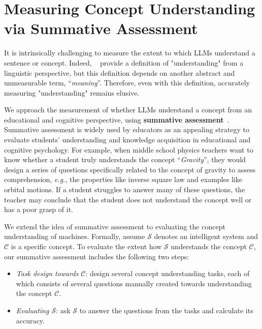 \section{Measuring Concept Understanding via Summative Assessment}
\label{sec:towards}







It is intrinsically challenging to measure the extent to which LLMs {understand} a sentence or concept. Indeed, ~\citet{bender2020climbing} provide a definition of "understanding" from a linguistic perspective, but this definition depends on another abstract and unmeasurable term, ``\emph{meaning}''. 
Therefore, even with this definition, accurately measuring "understanding" remains elusive.

We approach the measurement of whether LLMs understand a concept from an educational and cognitive perspective, using \textbf{summative assessment}~\cite{black1998assessment,black1998inside,harlen1997assessment}.
Summative assessment is widely used by educators as an appealing strategy to evaluate students' understanding and knowledge acquisition in educational and cognitive psychology.
For example, when middle school physics teachers want to know whether a student truly understands the concept ``\emph{Gravity}'', they would design a series of questions specifically related to the concept of gravity to assess comprehension, \emph{e.g.}, the properties like inverse square law and examples like orbital motions. If a student struggles to answer many of these questions, the teacher may conclude that the student does not understand the concept well or has a poor grasp of it.

We extend the idea of summative assessment to evaluating the concept understanding of machines. Formally, assume $\mathcal{S}$ denotes an intelligent system and $\mathcal{C}$ is a specific concept.
To evaluate the extent how $\mathcal{S}$ understands the concept $\mathcal{C}$, our summative assessment includes the following two steps:
\begin{itemize}[noitemsep,nolistsep,leftmargin=*]
    \item \emph{Task design towards $\mathcal{C}$}: design several concept understanding tasks, each of which consists of several questions manually created towards understanding the concept $\mathcal{C}$.
    \item \emph{Evaluating $\mathcal{S}$}: 
    ask $\mathcal{S}$ to answer the questions from the tasks and calculate its accuracy. 
\end{itemize}







